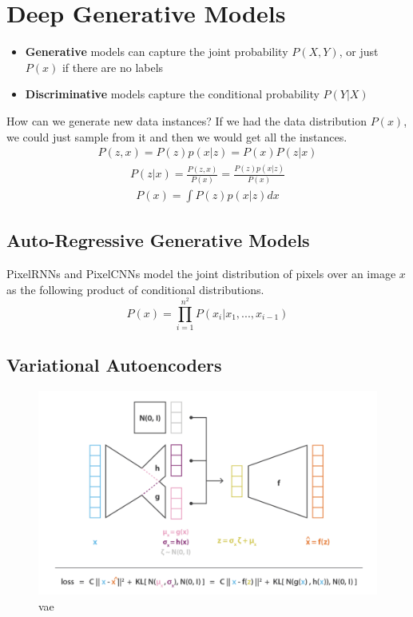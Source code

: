 \chapter{Deep Generative Models}

\begin{itemize}
    \item \textbf{Generative} models can capture the joint probability $P(X, Y)$, or just $P(x)$ if there are no labels
    \item \textbf{Discriminative} models capture the conditional probability $P(Y|X)$
\end{itemize}

How can we generate new data instances? If we had the data distribution $P(x)$, we could just sample
from it and then we would get all the instances.
\begin{equation}
    \begin{split}
        P(z, x) = P(z)p(x|z) = P(x)P(z|x)
    \end{split}
\end{equation}
\begin{equation}
    \begin{split}
        P(z|x) = \frac{P(z, x)}{P(x)}
        = \frac{P(z)p(x|z)}{P(x)}
    \end{split}
\end{equation}
\begin{equation}
    \begin{split}
        P(x) = \int P(z)p(x|z)dx
    \end{split}
\end{equation}

\section{Auto-Regressive Generative Models}
PixelRNNs and PixelCNNs model the joint distribution of pixels over an image $x$ as the following
product of conditional distributions.
\begin{equation}
    P(x) = \prod^{n^2}_{i=1}P(x_{i}|x_1,...,x_{i-1}) 
\end{equation}

\section{Variational Autoencoders}
\begin{figure}[H]
    \centering
    \includegraphics[width=12cm]{images/vae.png}
    \caption{vae}
    \label{fig:VAE}
\end{figure}
